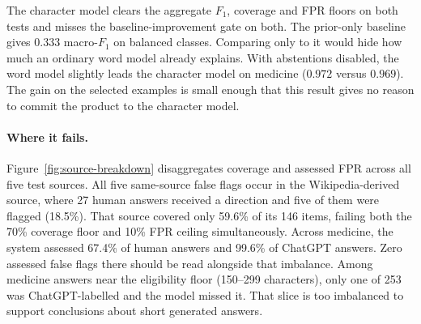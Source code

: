 \documentclass[11pt]{article}
\begin{document}
The character model clears the aggregate $F_1$, coverage and FPR floors on both tests and misses the baseline-improvement gate on both. The prior-only baseline gives 0.333 macro-$F_1$ on balanced classes. Comparing only to it would hide how much an ordinary word model already explains. With abstentions disabled, the word model slightly leads the character model on medicine ($0.972$ versus $0.969$). The gain on the selected examples is small enough that this result gives no reason to commit the product to the character model.

\paragraph{Where it fails.}
Figure~\ref{fig:source-breakdown} disaggregates coverage and assessed FPR across all five test sources. All five same-source false flags occur in the Wikipedia-derived source, where 27 human answers received a direction and five of them were flagged (18.5\%). That source covered only 59.6\% of its 146 items, failing both the 70\% coverage floor and 10\% FPR ceiling simultaneously. Across medicine, the system assessed 67.4\% of human answers and 99.6\% of ChatGPT answers. Zero assessed false flags there should be read alongside that imbalance. Among medicine answers near the eligibility floor (150--299 characters), only one of 253 was ChatGPT-labelled and the model missed it. That slice is too imbalanced to support conclusions about short generated answers.
\end{document}
